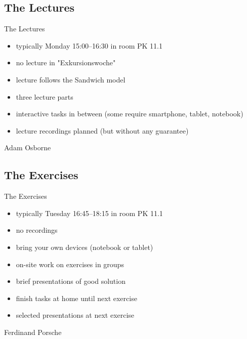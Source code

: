 
\subsection{The Lectures}
\begin{frame}{\insertsubsection}
	\begin{fancycolumns}[widths={60}]
		\begin{definition}{The Lectures}
			\begin{itemize}
				\item typically Monday 15:00--16:30 in room PK 11.1
				\item no lecture in "Exkursionswoche"
				\item lecture follows the Sandwich model
				\item three lecture parts
				\item interactive tasks in between (some require smartphone, tablet, notebook)
				\item lecture recordings planned (but without any guarantee)
			\end{itemize}
		\end{definition}
	\nextcolumn
		\begin{note}{Adam Osborne} %
		\end{note}
	\end{fancycolumns}
\end{frame}

\subsection{The Exercises}
\begin{frame}{\insertsubsection}
	\begin{fancycolumns}[widths={55}]
		\begin{definition}{The Exercises}
			\begin{itemize}
				\item typically Tuesday 16:45--18:15 in room PK 11.1
				\item no recordings
				\item bring your own devices (notebook or tablet)
				\item on-site work on exercises in groups
				\item brief presentations of good solution
				\item finish tasks at home until next exercise
				\item selected presentations at next exercise
			\end{itemize}
		\end{definition}
		\nextcolumn
		\begin{note}{Ferdinand Porsche}
		\end{note}
	\end{fancycolumns}
\end{frame}

